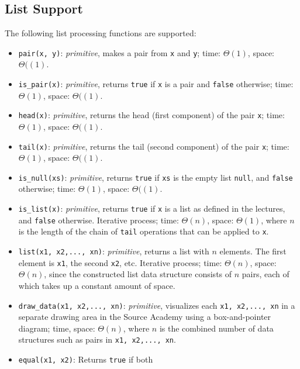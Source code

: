 \subsection*{List Support}

The following list processing functions are supported:

\begin{itemize}
\item \lstinline{pair(x, y)}: \textit{primitive}, makes a pair from \lstinline{x} and \lstinline{y}; time: $\Theta(1)$, space: $\Theta((1)$.
\item \lstinline{is_pair(x)}: \textit{primitive}, returns \lstinline{true} if \lstinline{x} is a
  pair and \lstinline{false} otherwise; time: $\Theta(1)$, space: $\Theta((1)$.
\item \lstinline{head(x)}: \textit{primitive}, returns the head (first component) of the pair \lstinline{x}; time: $\Theta(1)$, space: $\Theta((1)$.
\item \lstinline{tail(x)}: \textit{primitive}, returns the tail (second component) of the
  pair \lstinline{x}; time: $\Theta(1)$, space: $\Theta((1)$.
\item \lstinline{is_null(xs)}: \textit{primitive}, returns \lstinline{true} if \lstinline{xs} is the
  empty list \lstinline{null}, and \lstinline{false} otherwise; time: $\Theta(1)$, space: $\Theta((1)$.
\item \lstinline{is_list(x)}: \textit{primitive}, returns \lstinline{true} if
  \lstinline{x} is a list as defined in the lectures, and
  \lstinline{false} otherwise. Iterative process; 
time: $\Theta(n)$, space: $\Theta(1)$, where $n$ is the length of the 
chain of \lstinline{tail} operations that can be applied to \lstinline{x}.
\item \lstinline{list(x1, x2,..., xn)}: \textit{primitive}, returns a list with $n$ elements. The
first element is \lstinline{x1}, the second \lstinline{x2}, etc. Iterative
process; time: $\Theta(n)$, space: $\Theta(n)$, since the constructed list data structure
consists of $n$ pairs, each of which takes up a constant amount of space.
\item \lstinline{draw_data(x1, x2,..., xn)}: \textit{primitive}, visualizes each \lstinline{x1, x2,..., xn} in a separate drawing
  area in the Source Academy using a box-and-pointer diagram; time, space:
  $\Theta(n)$, where $n$ is the combined number of data structures such as
  pairs in \lstinline{x1, x2,..., xn}.
\item \lstinline{equal(x1, x2)}: Returns \lstinline{true} if both

\end{itemize}
